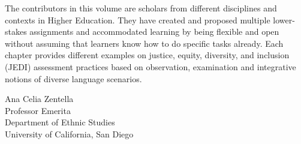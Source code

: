 
The contributors in this volume are scholars from different disciplines and contexts in Higher Education. They have created and proposed multiple lower-stakes assignments and accommodated learning by being flexible and open without assuming that learners know how to do specific tasks already. Each chapter provides different examples on justice, equity, diversity, and inclusion (JEDI) assessment practices based on observation, examination and integrative notions of diverse language scenarios.\medskip

\noindent Ana Celia Zentella\\
Professor Emerita\\
Department of Ethnic Studies\\
University of California, San Diego\\
